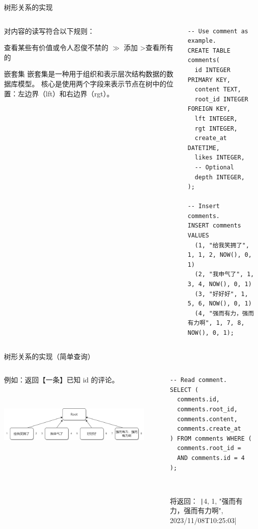 \documentclass[UTF8]{ctexbeamer}
\begin{document}
\begin{frame}[fragile]{树形关系的实现}
\begin{columns}
\begin{column}{0.35\textwidth}
对内容的读写符合以下规则：

查看某些有价值或令人忍俊不禁的 $\gg$ 添加 \textgreater 查看所有的

\begin{block}{嵌套集}
嵌套集是一种用于组织和表示层次结构数据的数据库模型。
核心是使用两个字段来表示节点在树中的位置：左边界（lft）和右边界（rgt）。
\end{block}
\end{column}
\begin{column}{0.65\textwidth}
\begin{verbatim}
-- Use comment as example.
CREATE TABLE comments(
  id INTEGER PRIMARY KEY,
  content TEXT,
  root_id INTEGER FOREIGN KEY,
  lft INTEGER,
  rgt INTEGER,
  create_at DATETIME,
  likes INTEGER,
  -- Optional
  depth INTEGER,
);

-- Insert comments.
INSERT comments VALUES
  (1, "给我笑拥了", 1, 1, 2, NOW(), 0, 1)
  (2, "我申气了", 1, 3, 4, NOW(), 0, 1)
  (3, "好好好", 1, 5, 6, NOW(), 0, 1)
  (4, "强而有力，强而有力啊", 1, 7, 8, NOW(), 0, 1);
\end{verbatim}
\end{column}
\end{columns}
\end{frame}

\begin{frame}[fragile]{树形关系的实现（简单查询）}
\begin{columns}
\begin{column}{0.45\textwidth}
例如：返回【一条】已知 id 的评论。

~

\includegraphics[width=0.9\textwidth, keepaspectratio]{assets/comment_0.png}

\end{column}
\begin{column}{0.5\textwidth}
\begin{verbatim}
-- Read comment.
SELECT (
  comments.id,
  comments.root_id,
  comments.content,
  comments.create_at
) FROM comments WHERE (
  comments.root_id = 
  AND comments.id = 4
);
\end{verbatim}
~

将返回：
\scriptsize
\texttt|4, 1, "强而有力，强而有力啊", 2023/11/08T10:25:03|
\normalsize

\end{column}
\end{columns}
\end{frame}
\end{document}
